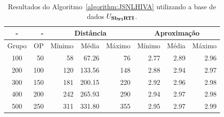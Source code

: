 \begin{table}[!htb]
  \caption{Resultados do Algoritmo~\ref{algorithm:JSNLHIVA} utilizando a base de dados $U_{\textbf{Sb\textsubscript{FI}RTI}}{}$.}
  \label{table:OTZHWXVI}
  \centering
  \begin{tabular}{|c|r|r|r|r|r|r|r|}
    \hline
      -      &  -   & \multicolumn{3}{c|}{Distância}             & \multicolumn{3}{c|}{Aproximação}           \\ \hline
    Grupo    & OP   & Mínimo       & Média        & Máximo       & Mínimo       & Média        & Máximo       \\ \hline  
    100      & 50   & 58           &  67.26       &  76          & 2.77         & 2.89         & 2.96         \\ \hline
    200      & 100  & 120          & 133.56       & 148          & 2.88         & 2.94         & 2.97         \\ \hline
    300      & 150  & 181          & 200.15       & 220          & 2.92         & 2.96         & 2.98         \\ \hline
    400      & 200  & 242          & 265.93       & 290          & 2.94         & 2.97         & 2.98         \\ \hline
    500      & 250  & 311          & 331.80       & 355          & 2.95         & 2.97         & 2.99         \\ \hline    
  \end{tabular}
\end{table}